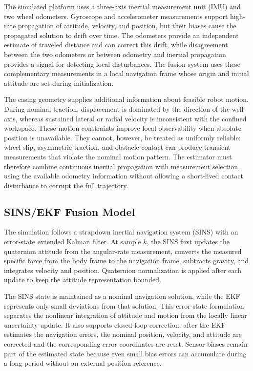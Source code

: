 \documentclass[research]{fcs}
\begin{document}
The simulated platform uses a three-axis inertial measurement unit (IMU) and two wheel odometers. Gyroscope and accelerometer measurements support high-rate propagation of attitude, velocity, and position, but their biases cause the propagated solution to drift over time. The odometers provide an independent estimate of traveled distance and can correct this drift, while disagreement between the two odometers or between odometry and inertial propagation provides a signal for detecting local disturbances. The fusion system uses these complementary measurements in a local navigation frame whose origin and initial attitude are set during initialization.

The casing geometry supplies additional information about feasible robot motion. During nominal traction, displacement is dominated by the direction of the well axis, whereas sustained lateral or radial velocity is inconsistent with the confined workspace. These motion constraints improve local observability when absolute position is unavailable. They cannot, however, be treated as uniformly reliable: wheel slip, asymmetric traction, and obstacle contact can produce transient measurements that violate the nominal motion pattern. The estimator must therefore combine continuous inertial propagation with measurement selection, using the available odometry information without allowing a short-lived contact disturbance to corrupt the full trajectory.

\subsection{SINS/EKF Fusion Model}
\label{subsec:ekf-model}

The simulation follows a strapdown inertial navigation system (SINS) with an error-state extended Kalman filter. At sample $k$, the SINS first updates the quaternion attitude from the angular-rate measurement, converts the measured specific force from the body frame to the navigation frame, subtracts gravity, and integrates velocity and position. Quaternion normalization is applied after each update to keep the attitude representation bounded.

The SINS state is maintained as a nominal navigation solution, while the EKF represents only small deviations from that solution. This error-state formulation separates the nonlinear integration of attitude and motion from the locally linear uncertainty update. It also supports closed-loop correction: after the EKF estimates the navigation errors, the nominal position, velocity, and attitude are corrected and the corresponding error coordinates are reset. Sensor biases remain part of the estimated state because even small bias errors can accumulate during a long period without an external position reference.
\end{document}
